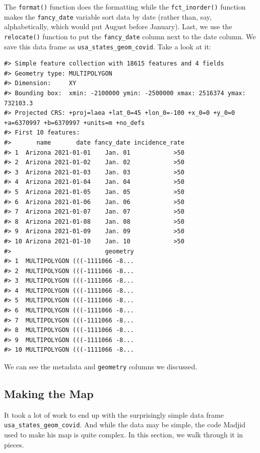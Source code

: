 \documentclass[
]{book}
\begin{document}
The \texttt{format()} function does the formatting while the \texttt{fct\_inorder()} function makes the \texttt{fancy\_date} variable sort data by date (rather than, say, alphabetically, which would put August before January). Last, we use the \texttt{relocate()} function to put the \texttt{fancy\_date} column next to the date column. We save this data frame as \texttt{usa\_states\_geom\_covid}. Take a look at it:

\begin{verbatim}
#> Simple feature collection with 18615 features and 4 fields
#> Geometry type: MULTIPOLYGON
#> Dimension:     XY
#> Bounding box:  xmin: -2100000 ymin: -2500000 xmax: 2516374 ymax: 732103.3
#> Projected CRS: +proj=laea +lat_0=45 +lon_0=-100 +x_0=0 +y_0=0 +a=6370997 +b=6370997 +units=m +no_defs
#> First 10 features:
#>       name       date fancy_date incidence_rate
#> 1  Arizona 2021-01-01    Jan. 01            >50
#> 2  Arizona 2021-01-02    Jan. 02            >50
#> 3  Arizona 2021-01-03    Jan. 03            >50
#> 4  Arizona 2021-01-04    Jan. 04            >50
#> 5  Arizona 2021-01-05    Jan. 05            >50
#> 6  Arizona 2021-01-06    Jan. 06            >50
#> 7  Arizona 2021-01-07    Jan. 07            >50
#> 8  Arizona 2021-01-08    Jan. 08            >50
#> 9  Arizona 2021-01-09    Jan. 09            >50
#> 10 Arizona 2021-01-10    Jan. 10            >50
#>                          geometry
#> 1  MULTIPOLYGON (((-1111066 -8...
#> 2  MULTIPOLYGON (((-1111066 -8...
#> 3  MULTIPOLYGON (((-1111066 -8...
#> 4  MULTIPOLYGON (((-1111066 -8...
#> 5  MULTIPOLYGON (((-1111066 -8...
#> 6  MULTIPOLYGON (((-1111066 -8...
#> 7  MULTIPOLYGON (((-1111066 -8...
#> 8  MULTIPOLYGON (((-1111066 -8...
#> 9  MULTIPOLYGON (((-1111066 -8...
#> 10 MULTIPOLYGON (((-1111066 -8...
\end{verbatim}

We can see the metadata and \texttt{geometry} columns we discussed.

\hypertarget{making-the-map}{%
\subsection*{Making the Map}\label{making-the-map}}

It took a lot of work to end up with the surprisingly simple data frame \texttt{usa\_states\_geom\_covid}. And while the data may be simple, the code Madjid used to make his map is quite complex. In this section, we walk through it in pieces.
\end{document}
